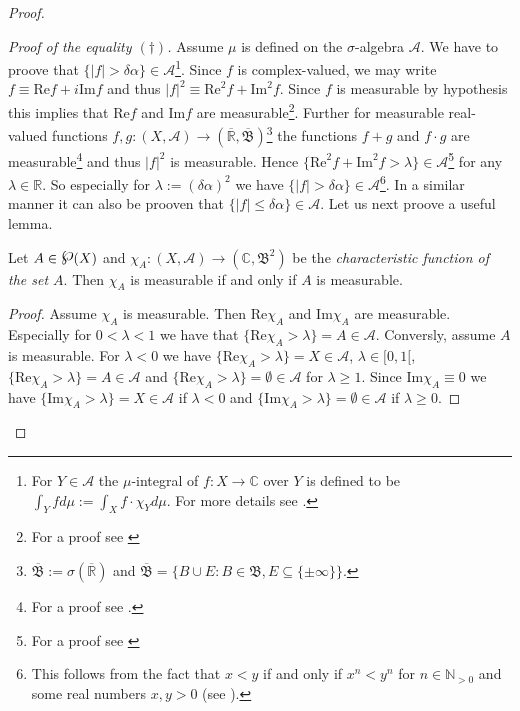\begin{proof}
\begin{enumerate}[label = \textbf{(\roman*.)}]
\begin{enumerate}[label = \textbf{\alph*.}]
	\emph{Proof of the equality $(\dagger)$.} Assume $\mu$ is defined on the $\sigma$-algebra $\mathcal{A}$. We have to proove that $\{\vert f \vert > \delta\alpha\} \in \mathcal{A}$\footnote{
		For $Y \in \mathcal{A}$ the $\mu$-integral of $f: X \rightarrow \mathbb{C}$ over $Y$ is defined to be $\displaystyle \int_Y fd\mu := \int_X f \cdot \chi_Y d\mu$. For more details see \cite[135--136]{elstrodt:mass:2011}.}.
		Since $f$ is complex-valued, we may write $f \equiv \mathrm{Re} f + i\mathrm{Im}f$ and thus $\vert f\vert^2 \equiv \mathrm{Re}^2 f + \mathrm{Im}^2f$. Since $f$ is measurable by hypothesis this implies that $ \mathrm{Re} f$ and $\mathrm{Im}f$ are measurable\footnote{For a proof see \cite[106]{elstrodt:mass:2011}}. Further for measurable real-valued functions $f,g: (X,\mathcal{A}) \rightarrow (\overline{\mathbb{R}},\overline{\mathfrak{B}})$\footnote{$\overline{\mathfrak{B}} := \sigma(\overline{\mathbb{R}})$ and $\overline{\mathfrak{B}} = \{B \cup E : B \in \mathfrak{B}, E \subseteq \{\pm \infty\}\}$.} 
		the functions $f + g$ and $f \cdot g$ are measurable\footnote{For a proof see \cite[107]{elstrodt:mass:2011}.}
		and thus $\vert f \vert^2$ is measurable. Hence $\{ \mathrm{Re}^2 f + \mathrm{Im}^2f > \lambda\} \in \mathcal{A}$\footnote{For a proof see \cite[105--106]{elstrodt:mass:2011}} for any $\lambda \in \mathbb{R}$. So especially for $\lambda := (\delta\alpha)^2$ we have $\{\vert f \vert > \delta\alpha\} \in \mathcal{A}$\footnote{This follows from the fact that $x < y$ if and only if $x^n < y^n$ for $n \in \mathbb{N}_{>0}$ and some real numbers $x,y > 0$ (see \cite[119]{zorich:analysis_I:2004}).}.
	In a similar manner it can also be prooven that $\{\vert f\vert \leqslant \delta \alpha\} \in \mathcal{A}$. Let us next proove a useful lemma.

	\begin{lemma}
		Let $A \in \powerset(X)$ and $\chi_A: (X,\mathcal{A}) \rightarrow (\mathbb{C},\mathfrak{B}^2)$ be the \emph{characteristic function of the set $A$}. Then $\chi_A$ is measurable if and only if $A$ is measurable.
			\label{lem:charfun}
	\end{lemma}
		
	\begin{proof}
		Assume $\chi_A$ is measurable. Then $\mathrm{Re}\chi_A$ and $\mathrm{Im}\chi_A$ are measurable. Especially for $0 < \lambda < 1$ we have that $\{\mathrm{Re}\chi_A > \lambda\} = A \in \mathcal{A}$. Conversly, assume $A$ is measurable. For $\lambda < 0$ we have $\{\mathrm{Re}\chi_A > \lambda\} = X \in \mathcal{A}$, $\lambda \in [0,1[$, $\{\mathrm{Re}\chi_A > \lambda\} = A \in \mathcal{A}$ and $\{\mathrm{Re}\chi_A > \lambda\} = \emptyset \in \mathcal{A}$ for $\lambda \geqslant 1$. Since $\mathrm{Im}\chi_A \equiv 0$ we have $\{\mathrm{Im}\chi_A > \lambda \} = X \in \mathcal{A}$ if $\lambda < 0$ and $\{\mathrm{Im}\chi_A > \lambda\} = \emptyset \in \mathcal{A}$ if $\lambda \geqslant 0$.   
	\end{proof}


\end{enumerate}
\end{enumerate}
\end{proof}
